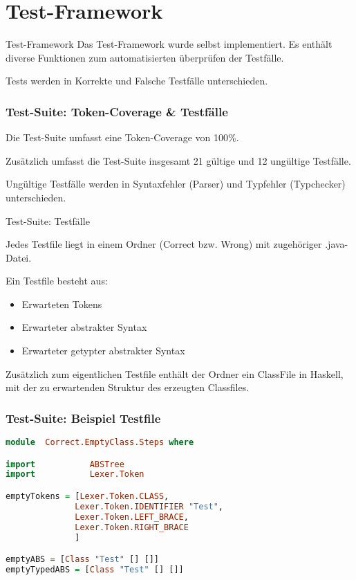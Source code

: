\section{Test-Framework}

\begin{frame}{Test-Framework}
Das Test-Framework wurde selbst implementiert. Es enthält diverse Funktionen zum automatisierten überprüfen der Testfälle.

\par \medskip

Tests werden in Korrekte und Falsche Testfälle unterschieden.


\end{frame}

\begin{frame}[fragile]
	\frametitle{Test-Suite: Token-Coverage \& Testfälle}
	
Die Test-Suite umfasst eine Token-Coverage von 100\%. 

\par \medskip

Zusätzlich umfasst die Test-Suite insgesamt 21 gültige und 12 ungültige Testfälle.

\par \medskip

Ungültige Testfälle werden in Syntaxfehler (Parser) und Typfehler (Typchecker) unterschieden.
\end{frame}

\begin{frame}{Test-Suite: Testfälle}

Jedes Testfile liegt in einem Ordner (Correct bzw. Wrong) mit zugehöriger .java-Datei. 	

\par \medskip

Ein Testfile besteht aus: 

\begin{itemize}
	\item Erwarteten Tokens
	\item Erwarteter abstrakter Syntax
	\item Erwarteter getypter abstrakter Syntax
\end{itemize}

Zusätzlich zum eigentlichen Testfile enthält der Ordner ein ClassFile in Haskell, mit der zu erwartenden Struktur des erzeugten Classfiles.
\end{frame}

\begin{frame}[fragile]
\frametitle{Test-Suite: Beispiel Testfile}
\begin{lstlisting}[language=Haskell]
module  Correct.EmptyClass.Steps where

import           ABSTree
import           Lexer.Token

emptyTokens = [Lexer.Token.CLASS,
              Lexer.Token.IDENTIFIER "Test",
              Lexer.Token.LEFT_BRACE,
              Lexer.Token.RIGHT_BRACE
              ]

emptyABS = [Class "Test" [] []]
emptyTypedABS = [Class "Test" [] []]	
\end{lstlisting}
	
\end{frame}

